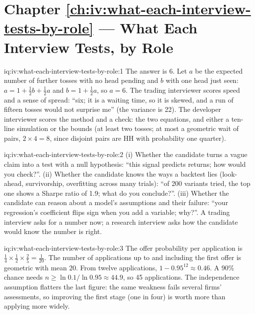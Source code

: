 \section*{Chapter \ref{ch:iv:what-each-interview-tests-by-role} --- What Each Interview Tests, by Role}

\begin{solution}{iq:iv:what-each-interview-tests-by-role:1}
The answer is 6. Let $a$ be the expected number of further tosses with no head pending and $b$ with one head
just seen: $a = 1 + \tfrac12 b + \tfrac12 a$ and $b = 1 + \tfrac12 a$, so $a = 6$. The trading interviewer
scores speed and a sense of spread: ``six; it is a waiting time, so it is skewed, and a run of fifteen tosses
would not surprise me'' (the variance is 22). The developer interviewer scores the method and a check: the two
equations, and either a ten-line simulation or the bounds (at least two tosses; at most a geometric wait of
pairs, $2 \times 4 = 8$, since disjoint pairs are HH with probability one quarter).
\end{solution}

\begin{solution}{iq:iv:what-each-interview-tests-by-role:2}
(i) Whether the candidate turns a vague claim into a test with a null hypothesis: ``this signal predicts
returns; how would you check?''. (ii) Whether the candidate knows the ways a backtest lies (look-ahead,
survivorship, overfitting across many trials): ``of 200 variants tried, the top one shows a Sharpe ratio of
1.9; what do you conclude?''. (iii) Whether the candidate can reason about a model's assumptions and their
failure: ``your regression's coefficient flips sign when you add a variable; why?''. A trading interview asks
for a number now; a research interview asks how the candidate would know the number is right.
\end{solution}

\begin{solution}{iq:iv:what-each-interview-tests-by-role:3}
The offer probability per application is $\tfrac14 \times \tfrac12 \times \tfrac25 = \tfrac1{20}$. The number
of applications up to and including the first offer is geometric with mean 20. From twelve applications,
$1 - 0.95^{12} \approx 0.46$. A 90\% chance needs $n \ge \ln 0.1 / \ln 0.95 \approx 44.9$, so 45
applications. The independence assumption flatters the last figure: the same weakness fails several firms'
assessments, so improving the first stage (one in four) is worth more than applying more widely.
\end{solution}

